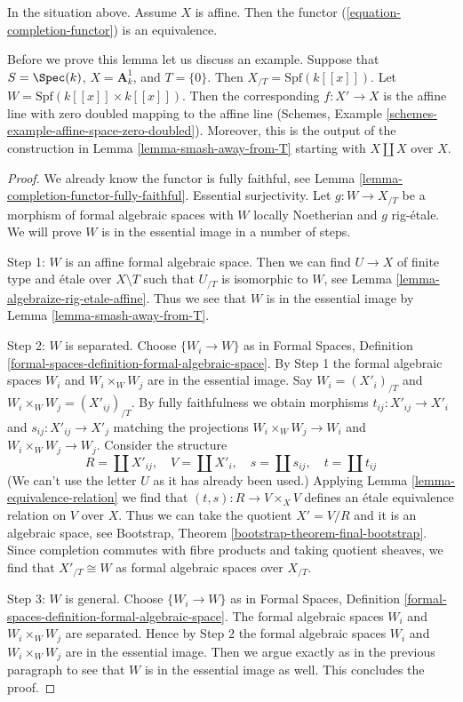 \begin{lemma}
\label{lemma-dilatations-affine}
In the situation above. Assume $X$ is affine. Then the functor
(\ref{equation-completion-functor}) is an equivalence.
\end{lemma}

\noindent
Before we prove this lemma let us discuss an example. Suppose that
$S = \Spec(k)$, $X = \mathbf{A}^1_k$, and $T = \{0\}$. Then
$X_{/T} = \text{Spf}(k[[x]])$. Let $W = \text{Spf}(k[[x]] \times k[[x]])$.
Then the corresponding $f : X' \to X$ is the affine line with zero doubled
mapping to the affine line
(Schemes, Example \ref{schemes-example-affine-space-zero-doubled}).
Moreover, this is the output of the construction in
Lemma \ref{lemma-smash-away-from-T}
starting with $X \amalg X$ over $X$.

\begin{proof}
We already know the functor is fully faithful, see
Lemma \ref{lemma-completion-functor-fully-faithful}.
Essential surjectivity. Let $g : W \to X_{/T}$ be a morphism
of formal algebraic spaces with $W$ locally Noetherian
and $g$ rig-\'etale. We will prove $W$ is in the essential
image in a number of steps.

\medskip\noindent
Step 1: $W$ is an affine formal algebraic space. Then we can find
$U \to X$ of finite type and \'etale over $X \setminus T$ such that
$U_{/T}$ is isomorphic to $W$, see
Lemma \ref{lemma-algebraize-rig-etale-affine}.
Thus we see that $W$ is in the essential image by
Lemma \ref{lemma-smash-away-from-T}.

\medskip\noindent
Step 2: $W$ is separated. Choose $\{W_i \to W\}$ as in
Formal Spaces, Definition \ref{formal-spaces-definition-formal-algebraic-space}.
By Step 1 the formal algebraic spaces $W_i$ and $W_i \times_W W_j$
are in the essential image.
Say $W_i = (X'_i)_{/T}$ and $W_i \times_W W_j = (X'_{ij})_{/T}$.
By fully faithfulness we obtain morphisms $t_{ij} : X'_{ij} \to X'_i$
and $s_{ij} : X'_{ij} \to X'_j$ matching the projections
$W_i \times_W W_j \to W_i$ and $W_i \times_W W_j \to W_j$.
Consider the structure
$$
R = \coprod X'_{ij},\quad
V = \coprod X'_i,\quad
s = \coprod s_{ij},\quad
t = \coprod t_{ij}
$$
(We can't use the letter $U$ as it has already been used.)
Applying Lemma \ref{lemma-equivalence-relation} we find that
$(t, s) : R \to V \times_X V$ defines an \'etale equivalence relation
on $V$ over $X$. Thus we can take the quotient $X' = V/R$ and
it is an algebraic space, see
Bootstrap, Theorem \ref{bootstrap-theorem-final-bootstrap}.
Since completion commutes with fibre products and taking
quotient sheaves, we find that
$X'_{/T} \cong W$ as formal algebraic spaces over $X_{/T}$.

\medskip\noindent
Step 3: $W$ is general. Choose $\{W_i \to W\}$ as in
Formal Spaces, Definition \ref{formal-spaces-definition-formal-algebraic-space}.
The formal algebraic spaces $W_i$ and $W_i \times_W W_j$ are separated.
Hence by Step 2  the formal algebraic spaces $W_i$ and $W_i \times_W W_j$
are in the essential image. Then we argue exactly as in the previous
paragraph to see that $W$ is in the essential image as well.
This concludes the proof.
\end{proof}

